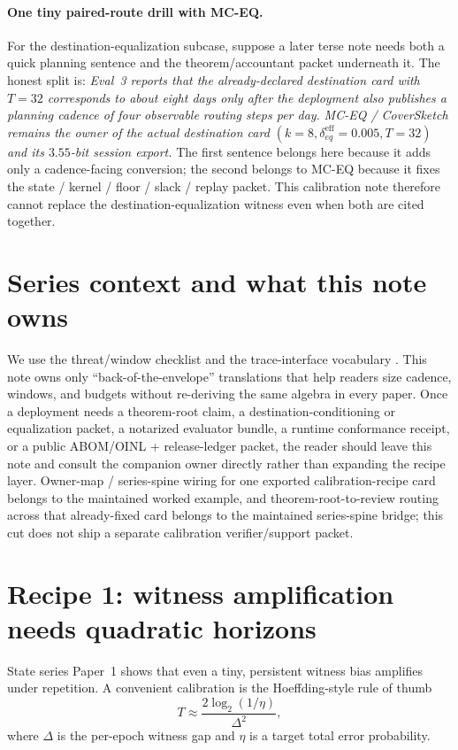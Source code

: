 \documentclass[11pt]{article}
\begin{document}
\paragraph{One tiny paired-route drill with MC-EQ.}
For the destination-equalization subcase, suppose a later terse note needs both a quick planning sentence and the theorem/accountant packet underneath it. The honest split is: \emph{Eval~3 reports that the already-declared destination card with $T=32$ corresponds to about eight days only after the deployment also publishes a planning cadence of four observable routing steps per day.} \emph{MC-EQ / CoverSketch remains the owner of the actual destination card $(k=8,\delta_{eq}^{\mathrm{eff}}=0.005,T=32)$ and its $3.55$-bit session export.} The first sentence belongs here because it adds only a cadence-facing conversion; the second belongs to MC-EQ because it fixes the state / kernel / floor / slack / replay packet. This calibration note therefore cannot replace the destination-equalization witness even when both are cited together.\cite{series:mceq}

\section{Series context and what this note owns}
We use the threat/window checklist \cite{series:threatwindows} and the trace-interface vocabulary \cite{series:traceifaces}.
This note owns only ``back-of-the-envelope'' translations that help readers size cadence, windows, and budgets without re-deriving the same algebra in every paper.
Once a deployment needs a theorem-root claim, a destination-conditioning or equalization packet, a notarized evaluator bundle, a runtime conformance receipt, or a public ABOM/OINL + release-ledger packet, the reader should leave this note and consult the companion owner directly rather than expanding the recipe layer. Owner-map / series-spine wiring for one exported calibration-recipe card belongs to the maintained worked example, and theorem-root-to-review routing across that already-fixed card belongs to the maintained series-spine bridge; this cut does not ship a separate calibration verifier/support packet.\cite{state1,state2,state3,series:mceq,series:eval1,series:opB,series:abom,series:releaseproperty,series:workedexample,series:seriesspines}

\section{Recipe 1: witness amplification needs quadratic horizons}
State series Paper~1 \cite{state1} shows that even a tiny, persistent witness bias amplifies under repetition.
A convenient calibration is the Hoeffding-style rule of thumb
\[
T \approx \frac{2\log_2(1/\eta)}{\Delta^2},
\]
where $\Delta$ is the per-epoch witness gap and $\eta$ is a target total error probability.
\end{document}
